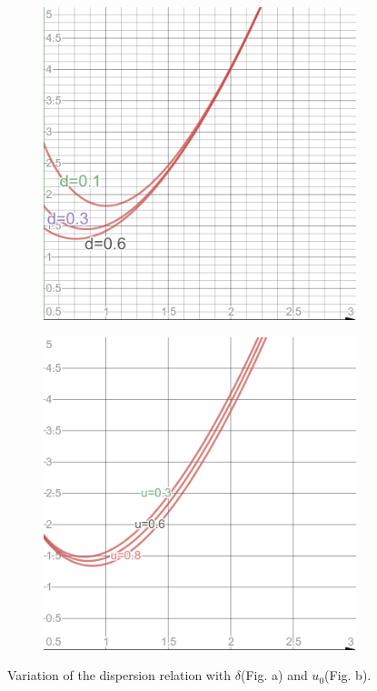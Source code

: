 \documentclass[a4paper, 12pt]{article}
\begin{document}
\newpage
\begin{figure}[h]
    \begin{subfigure}{0.5\textwidth}
    \centering
    \includegraphics[scale=0.2]{real-disp-d_var.png}
    \label{disp-real-delta}
    \end{subfigure}
    \begin{subfigure}{0.5\textwidth}
    \centering
    \includegraphics[scale=0.2]{real-disp-u0-var.png}
    \label{disp-real-u0}
    \end{subfigure}
    \caption{Variation of the dispersion relation with $\delta$(Fig. a) and $u_0$(Fig. b).}
    \label{disp-var2}
\end{figure}
\end{document}
